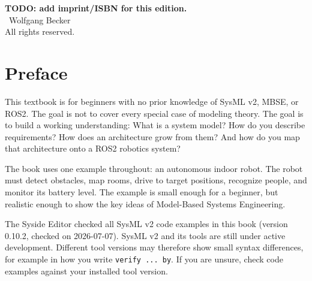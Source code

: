 %

\providecommand{\editionimpressum}{%
    \textbf{TODO: add imprint/ISBN for this edition.}\\[1em]
    \textcopyright\ Wolfgang Becker\\
    All rights reserved.
}

\frontmatter
\maketitle

\cleardoublepage
\thispagestyle{empty}
\vspace*{\fill}
\noindent
\editionimpressum
\vspace*{\fill}
\clearpage

\tableofcontents

\chapter*{Preface}
This textbook is for beginners with no prior knowledge of SysML v2, MBSE, or ROS2.
The goal is not to cover every special case of modeling theory. The goal is to build a working understanding:
What is a system model? How do you describe requirements? How does an architecture grow from them? And how do you map that architecture onto a ROS2 robotics system?

The book uses one example throughout: an autonomous indoor robot. The robot must detect obstacles, map rooms, drive to target positions, recognize people, and monitor its battery level.
The example is small enough for a beginner, but realistic enough to show the key ideas of Model-Based Systems Engineering.

The Syside Editor checked all SysML v2 code examples in this book (version 0.10.2, checked on 2026-07-07). SysML v2 and its tools are still under active development. Different tool versions may therefore show small syntax differences, for example in how you write \texttt{verify ... by}. If you are unsure, check code examples against your installed tool version.

